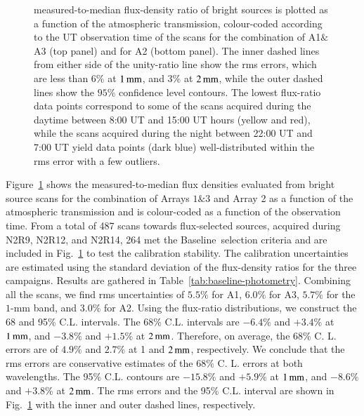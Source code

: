 \documentclass[traditionalabstract]{aa}
\newcommand{\baseline}{Baseline}%
\newcommand{\lp}[1]{#1}
\begin{document}
{\begin{figure}[!thbp]
\begin{center}
{      measured-to-median flux-density ratio of bright sources is
      plotted as a function of the atmospheric transmission,
      colour-coded according to the UT
      observation time of the scans for the combination of A1$\&$A3
      (top panel)
      and for A2 (bottom panel).
      The inner dashed lines from either side of the
      unity-ratio line show the rms errors, {\lp which
      are less than 6\% at $1\,\rm{mm}$, and 3\% at $2\,\rm{mm}$, while
      the outer dashed lines show the $95\%$ confidence level contours.}
      The lowest flux-ratio data points correspond to some of the
      scans acquired during the daytime between 8:00 UT and 15:00 UT
      hours (yellow and red), while the scans acquired during the night
      between 22:00 UT and 7:00 UT yield data points (dark blue)
      well-distributed within the rms error with a few outliers.}
    \label{fig:allbright_rms_corrected_skydip}
  \end{center}
\end{figure}
Figure~\ref{fig:allbright_rms_corrected_skydip} shows the
measured-to-median flux densities evaluated from bright source scans
for the combination of Arrays $1\&3$ and Array 2 as a function of the
atmospheric transmission and is colour-coded as a function of the
observation time. From a total of 487 scans towards
flux-selected sources, acquired during N2R9, N2R12, and N2R14, 264 met
the \baseline\ selection criteria and are included in
Fig.~\ref{fig:allbright_rms_corrected_skydip} to test the
calibration stability. The calibration uncertainties are
estimated using the standard deviation of the flux-density ratios for
the three campaigns. Results are gathered in
Table~\ref{tab:baseline-photometry}.
Combining all the scans, we find rms uncertainties of $5.5\%$ for A1,
$6.0\%$ for A3, $5.7\%$ for the $1$-mm band, and $3.0\%$ for A2.
{\lp Using the flux-ratio distributions, we construct the 68 and 95\%
C.L. intervals. The 68\% C.L. intervals are $-6.4\%$ and $+3.4\%$ at
$1\,\rm{mm}$, and $-3.8\%$ and $+1.5\%$ at $2\, \rm{mm}$. Therefore, on average,
the 68\% C. L. errors are of $4.9\%$ and $2.7\%$ at 1 and $2\, \rm{mm}$,
respectively. We conclude that the rms errors are conservative
estimates of the 68\% C. L. errors at both wavelengths. The 95\%
C.L. contours are $-15.8\%$ and $+5.9\%$ at $1\,\rm{mm}$, and $-8.6\%$ and
$+3.8\%$ at $2\, \rm{mm}$.
The rms errors and the 95\%
C.L. interval are shown in
Fig.~\ref{fig:allbright_rms_corrected_skydip} with the inner and
outer dashed lines, respectively.} 

}
\end{document}
